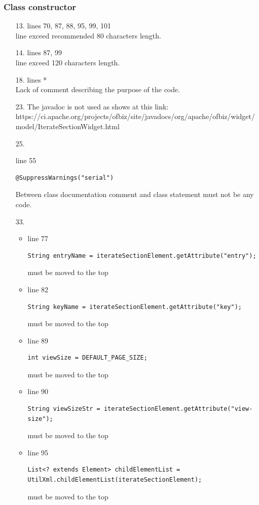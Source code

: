 \documentclass[english]{article}
\begin{document}
\subsubsection*{Class constructor}	
\begin{itemize}
\item[13.]{lines 70, 87, 88, 95, 99, 101 \\
		line exceed recommended 80 characters length.}

\item[14.]{lines  87, 99\\
		line exceed 120 characters length.}
\item[18.]{lines  *\\
		Lack of comment describing the purpose of the code.}
		
\item[23.]{The javadoc is not used as shows at this link:\\
https://ci.apache.org/projects/ofbiz/site/javadocs/org/apache/ofbiz/widget/model/IterateSectionWidget.html}
	\item[25.]{line 55
		\begin{lstlisting}
@SuppressWarnings("serial")
		\end{lstlisting}
Between class documentation comment and class statement must not be any code.
}

\item[33.]{ 
			\begin{itemize}
				\item{line 77
						\begin{lstlisting}
String entryName = iterateSectionElement.getAttribute("entry");
						\end{lstlisting} must be moved to the top}
				\item{line 82
						\begin{lstlisting}
String keyName = iterateSectionElement.getAttribute("key");
						\end{lstlisting} must be moved to the top}
				\item{line 89
						\begin{lstlisting}
int viewSize = DEFAULT_PAGE_SIZE;
						\end{lstlisting} must be moved to the top}
				\item{line 90
						\begin{lstlisting}
String viewSizeStr = iterateSectionElement.getAttribute("view-size");
						\end{lstlisting} must be moved to the top}
				\item{line 95
						\begin{lstlisting}
List<? extends Element> childElementList = UtilXml.childElementList(iterateSectionElement);
						\end{lstlisting} must be moved to the top}
			\end{itemize}
}
		

\end{itemize}
\end{document}
